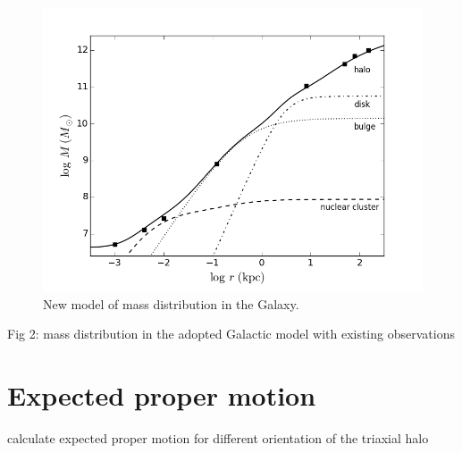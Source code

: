 \documentclass[iop]{emulateapj}
\begin{document}
\begin{figure}[t]
\includegraphics[width=1.05\hsize]{galactic_mass_obs.png}
  \vspace{-0.2cm}
\caption{\small New model of mass distribution in the Galaxy.}
  \vspace{0.3cm}
  \label{fig:galactic_model}
\end{figure}

Fig 2: mass distribution in the adopted Galactic model with existing observations



\section{Expected proper motion}

calculate expected proper motion for different orientation of the triaxial halo
\end{document}
